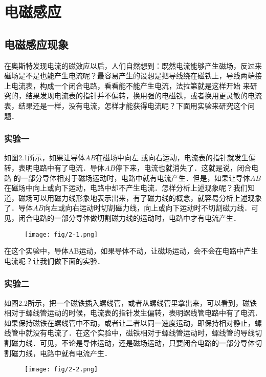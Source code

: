 \chapter{电磁感应}
\section{电磁感应现象}

在奥斯特发现电流的磁效应以后，人们自然想到：既然电流能够产生磁场，反过来磁场是不是也能产生电流呢？最容易产生的设想是把导线绕在磁铁上，导线两端接上电流表，构成一个闭合电路，看看能不能产生电流，法拉第就是这样开始
来研究的，结果发现电流表的指针并不偏转，换用强的电磁铁，或者换用更灵敏的电流表，结果还是一样，没有电流，怎样才能获得电流呢？下面用实验来研究这个问题．


\subsection*{实验一}
如图2.1所示，如果让导体$AB$在磁场中向左
或向右运动，电流表的指针就发生偏转，表明电路中有了电流．导体$AB$停下来，电流也就消失了．这就是说，闭合电路
的一部分导体相对于磁场运动时，电路中就有电流产生．但是，如果让导体$AB$在磁场中向上或向下运动，电路中却不产生电流．怎样分析上述现象呢？我们知道，磁场可以用磁力线形象地表示出来，有了磁力线的概念，就容易分析上述现象了．导体$AB$向左或向右运动时切割磁力线，向上或向下运动时不切割磁力线．可见，闭合电路的一部分导体做切割磁力线的运动时，电路中才有电流产生．
\begin{figure}[htp]\centering
\texttt{[image: fig/2-1.png]}
\caption{}
\end{figure}

在这个实验中，导体AB运动，如果导体不动，让磁场运动，会不会在电路中产生电流呢？让我们做下面的实验．

\subsection*{实验二}

如图2.2所示，把一个磁铁插入螺线管，或者从螺线管里拿出来，可以看到，磁铁相对于螺线管运动的时候，电流表的指针发生偏转，表明螺线管电路中有了电流．如果保持磁铁在螺线管中不动，或者让二者以同一速度运动，即保持相对静止，螺线管中就没有电流了．在这个实验中，磁铁相对于螺线管运动时，螺线管的导线切割磁力线．可见，不论是导体运动，还是磁场运动，只要闭合电路的一部分导体切割磁力线，电路中就有电流产生．
\begin{figure}[htp]\centering
\texttt{[image: fig/2-2.png]}
\caption{}
\end{figure}

